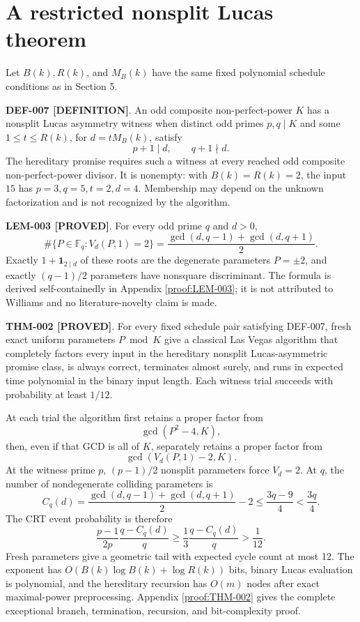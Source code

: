 \documentclass[11pt]{article}
\newcommand{\claimstatus}[2]{\textbf{#1 [#2]}}
\begin{document}
\section{A restricted nonsplit Lucas theorem}

Let \(B(k),R(k)\), and \(M_B(k)\) have the same fixed polynomial schedule
conditions as in Section 5.

\claimstatus{DEF-007}{DEFINITION}. An odd composite non-perfect-power \(K\)
has a nonsplit Lucas asymmetry witness when distinct odd primes \(p,q\mid K\)
and some \(1\le t\le R(k)\), for \(d=tM_B(k)\), satisfy
\[
p+1\mid d,\qquad q+1\nmid d.
\]
The hereditary promise requires such a witness at every reached odd composite
non-perfect-power divisor. It is nonempty: with \(B(k)=R(k)=2\), the input
\(15\) has \(p=3,q=5,t=2,d=4\). Membership may depend on the unknown
factorization and is not recognized by the algorithm.

\claimstatus{LEM-003}{PROVED}. For every odd prime \(q\) and \(d>0\),
\[
\#\{P\in\mathbb F_q:V_d(P,1)=2\}
=\frac{\gcd(d,q-1)+\gcd(d,q+1)}2.                 \tag{1}
\]
Exactly \(1+\mathbf1_{2\mid d}\) of these roots are the degenerate parameters
\(P=\pm2\), and exactly \((q-1)/2\) parameters have nonsquare discriminant.
The formula is derived self-containedly in Appendix \ref{proof:LEM-003}; it
is not attributed to Williams and no literature-novelty claim is made.

\claimstatus{THM-002}{PROVED}. For every fixed schedule pair satisfying
DEF-007, fresh exact uniform parameters \(P\bmod K\) give a classical Las
Vegas algorithm that completely factors every input in the hereditary
nonsplit Lucas-asymmetric promise class, is always correct, terminates almost
surely, and runs in expected time polynomial in the binary input length. Each
witness trial succeeds with probability at least \(1/12\).

At each trial the algorithm first retains a proper factor from
\[
\gcd(P^2-4,K),
\]
then, even if that GCD is all of \(K\), separately retains a proper factor from
\[
\gcd(V_d(P,1)-2,K).
\]
At the witness prime \(p\), \((p-1)/2\) nonsplit parameters force
\(V_d=2\). At \(q\), the number of nondegenerate colliding parameters is
\[
C_q(d)=
\frac{\gcd(d,q-1)+\gcd(d,q+1)}2-2
\le\frac{3q-9}{4}<\frac{3q}{4}.
\]
The CRT event probability is therefore
\[
\frac{p-1}{2p}\frac{q-C_q(d)}q
\ge\frac13\frac{q-C_q(d)}q>\frac1{12}.
\]
Fresh parameters give a geometric tail with expected cycle count at most
12. The exponent has
\(O(B(k)\log B(k)+\log R(k))\) bits, binary Lucas evaluation is polynomial,
and the hereditary recursion has \(O(m)\) nodes after exact maximal-power
preprocessing. Appendix \ref{proof:THM-002} gives the complete exceptional
branch, termination, recursion, and bit-complexity proof.
\end{document}
